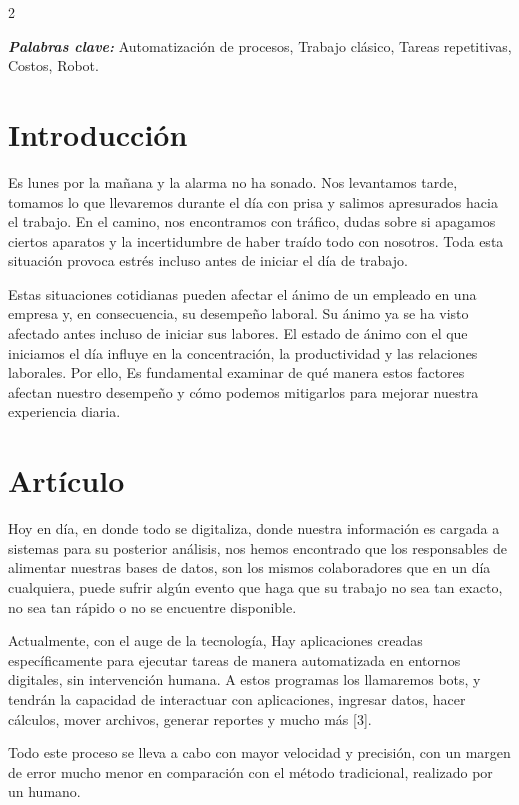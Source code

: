 \documentclass[12pt,spanish,Letterpaper,openany]{book}
\begin{document}
\begin {multicols}{2}

\textbf{\emph{Palabras clave:}} Automatización de procesos, Trabajo clásico, Tareas repetitivas, Costos, Robot.

\hypertarget{introducciuxf3n-13}{%
\section{Introducción}\label{introducciuxf3n-13}}

Es lunes por la mañana y la alarma no ha sonado. Nos levantamos tarde, tomamos lo que
llevaremos durante el día con prisa y salimos apresurados hacia el trabajo. En el camino, nos
encontramos con tráfico, dudas sobre si apagamos ciertos aparatos y la incertidumbre de haber
traído todo con nosotros. Toda esta situación provoca estrés incluso antes de iniciar el día de
trabajo.

Estas situaciones cotidianas pueden afectar el ánimo de un empleado en una empresa y, en
consecuencia, su desempeño laboral. Su ánimo ya se ha visto afectado antes incluso de iniciar
sus labores. El estado de ánimo con el que iniciamos el día influye en la concentración, la
productividad y las relaciones laborales. Por ello, Es fundamental examinar de qué manera
estos factores afectan nuestro desempeño y cómo podemos mitigarlos para mejorar nuestra
experiencia diaria.

\hypertarget{artuxedculo-13}{%
\section{Artículo}\label{artuxedculo-13}}

Hoy en día, en donde todo se digitaliza, donde nuestra información es cargada a sistemas para
su posterior análisis, nos hemos encontrado que los responsables de alimentar nuestras bases
de datos, son los mismos colaboradores que en un día cualquiera, puede sufrir algún evento que
haga que su trabajo no sea tan exacto, no sea tan rápido o no se encuentre disponible.

Actualmente, con el auge de la tecnología, Hay aplicaciones creadas específicamente para
ejecutar tareas de manera automatizada en entornos digitales, sin intervención humana. A
estos programas los llamaremos bots, y tendrán la capacidad de interactuar con aplicaciones,
ingresar datos, hacer cálculos, mover archivos, generar reportes y mucho más {[}3{]}.

Todo este proceso se lleva a cabo con mayor velocidad y precisión, con un margen de error
mucho menor en comparación con el método tradicional, realizado por un humano.


\end{multicols}
\end{document}
